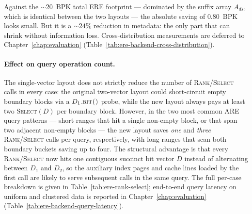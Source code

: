 Against the $\sim 20$~BPK total ERE footprint --- dominated by the
suffix array $A_{ds}$, which is identical between the two layouts ---
the absolute saving of $0.80$~BPK looks small.
But it is a $\sim 24\%$ reduction in metadata: the only part that
can shrink without information loss.
Cross-distribution measurements are deferred to
Chapter~\ref{chap:evaluation}
(Table~\ref{tab:ere-backend-cross-distribution}).

\paragraph{Effect on query operation count.}
The single-vector layout does not strictly reduce the number of \textsc{Rank}/\textsc{Select} calls in every case: the original two-vector layout could short-circuit empty boundary blocks via a $D_1.\textsc{bit()}$ probe, while the new layout always pays at least two \textsc{Select}$(D)$ per boundary block.
However, in the two most common ARE query patterns --- short ranges that hit a single non-empty block, or that span two adjacent non-empty blocks --- the new layout saves \emph{one} and \emph{three} \textsc{Rank}/\textsc{Select} calls per query, respectively, with long ranges that scan both boundary buckets saving up to four.
The structural advantage is that every \textsc{Rank}/\textsc{Select} now hits one contiguous succinct bit vector $D$ instead of alternating between $D_1$ and $D_2$, so the auxiliary index pages and cache lines loaded by the first call are likely to serve subsequent calls in the same query.
The full per-case breakdown is given in Table~\ref{tab:ere-rank-select};
end-to-end query latency on uniform and clustered data is reported in
Chapter~\ref{chap:evaluation}
(Table~\ref{tab:ere-backend-query-latency}).

